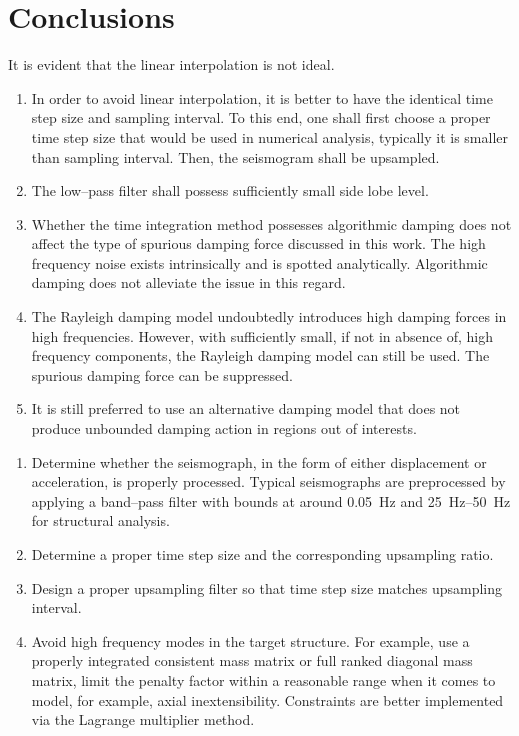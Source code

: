 \section{Conclusions}
It is evident that the linear interpolation is not ideal.
\begin{enumerate}
\item In order to avoid linear interpolation, it is better to have the identical time step size and sampling interval. To this end, one shall first choose a proper time step size that would be used in numerical analysis, typically it is smaller than sampling interval. Then, the seismogram shall be upsampled.
\item The low--pass filter shall possess sufficiently small side lobe level.
\item Whether the time integration method possesses algorithmic damping does not affect the type of spurious damping force discussed in this work. The high frequency noise exists intrinsically and is spotted analytically. Algorithmic damping does not alleviate the issue in this regard.
\item The Rayleigh damping model undoubtedly introduces high damping forces in high frequencies. However, with sufficiently small, if not in absence of, high frequency components, the Rayleigh damping model can still be used. The spurious damping force can be suppressed.
\item It is still preferred to use an alternative damping model that does not produce unbounded damping action in regions out of interests.
\end{enumerate}

\begin{enumerate}
\item Determine whether the seismograph, in the form of either displacement or acceleration, is properly processed. Typical seismographs are preprocessed by applying a band--pass filter with bounds at around \SI{0.05}{\hertz} and \SIrange{25}{50}{\hertz} for structural analysis.
\item Determine a proper time step size and the corresponding upsampling ratio.
\item Design a proper upsampling filter so that time step size matches upsampling interval.
\item Avoid high frequency modes in the target structure. For example, use a properly integrated consistent mass matrix or full ranked diagonal mass matrix, limit the penalty factor within a reasonable range when it comes to model, for example, axial inextensibility. Constraints are better implemented via the Lagrange multiplier method.
\end{enumerate}